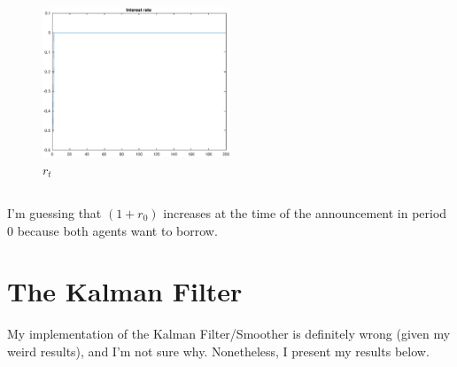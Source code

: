 \documentclass[12pt]{article}
\begin{document}
\begin{figure}[h]
    \centering
        \includegraphics[width=0.5\textwidth]{IRF_r.eps}
        \caption{$r_t$}
\end{figure}
 
\subsection{} I'm guessing that $(1+r_0)$ increases at the time of the announcement in period 0 because both agents want to borrow.

\newpage

\section{The Kalman Filter}
My implementation of the Kalman Filter/Smoother is definitely wrong (given my weird results), and I'm not sure why. Nonetheless, I present my results below.\\
\end{document}
